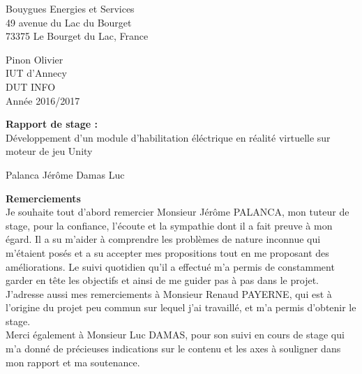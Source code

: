 \documentclass[a4paper]{article}
\begin{document}
    \pagestyle{fancy}
    \thispagestyle{empty}
    \noindent
    \begin{minipage}{.5\textwidth}
        Bouygues Energies et Services \\
        49 avenue du Lac du Bourget \\
        73375 Le Bourget du Lac, France
    \end{minipage}
    \begin{minipage}{.5\textwidth}
    \begin{flushright}
        Pinon Olivier \\
        IUT d'Annecy \\
        DUT INFO \\
        Année 2016/2017 \\
    \end{flushright}
    \end{minipage}
    
    \vfill 
    \begin{center}
		\Huge{\textbf{Rapport de stage : }} \\
        \vspace{20pt}
        \Large{Développement d'un module d'habilitation éléctrique en réalité virtuelle sur moteur de jeu Unity}
        
	\end{center}
    \vfill 
    
    Palanca Jérôme  \hfill Damas Luc

 	\newpage 
    \huge \textbf{Remerciements} \vspace{10pt} \\

    \normalsize
    Je souhaite tout d'abord remercier Monsieur Jérôme PALANCA, mon tuteur de stage, pour la confiance, l'écoute et la sympathie dont il a fait preuve à mon égard. Il a su m'aider à comprendre les problèmes de nature inconnue qui m'étaient posés et a su accepter mes propositions tout en me proposant des améliorations. Le suivi quotidien qu'il a effectué m'a permis de constamment garder en tête les objectifs et ainsi de me guider pas à pas dans le projet. \vspace{10pt} \\

    J'adresse aussi mes remerciements à Monsieur Renaud PAYERNE, qui est à l'origine du projet peu commun sur lequel j'ai travaillé, et m'a permis d'obtenir le stage. \vspace{10pt} \\
	Merci également à Monsieur Luc DAMAS, pour son suivi en cours de stage qui m'a donné de précieuses indications sur le contenu et les axes à souligner dans mon rapport et ma soutenance. \vspace{10pt} \\
\end{document}
